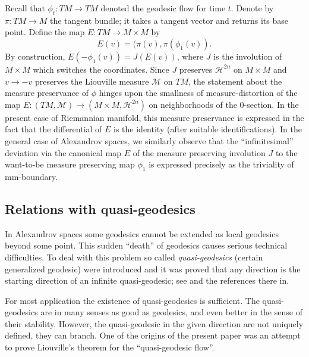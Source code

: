 \documentclass[12pt,leqno]{amsart}
\numberwithin{equation}{section}
\theoremstyle{definition}
\theoremstyle{remark}
\def\:{\colon}
\begin{document}
Recall that $\phi_t\: TM\to TM$ denoted the geodesic flow for time $t$.
Denote by $\pi\: TM\to M$ the tangent bundle; it takes a tangent vector and returns its base point.
Define the map $E\:TM\to M\times M$  by 
\[E(v)=(\pi(v), \pi (\phi _1 (v)).\]  
By construction, $E(-\phi_1(v))= J(E(v))$, 
where $J$ is the involution of $M\times M$ which switches the coordinates. 
Since $J$ preserves $\mathcal H^{2n}$ on $M\times M$ and $v\to -v$ preserves the Liouville measure $\mathcal M$ on $TM$,
the statement about the measure preservance of $\phi$ hinges upon the smallness of measure-distortion of the map $E \:(TM,\mathcal M) \to (M\times M, \mathcal H^{2n})$ on neighborhoods of the $0$-section.
In the present case of Riemannian manifold,
this measure preservance is expressed in  the fact that the differential of $E$ is the identity (after suitable identifications).
In the general case of Alexandrov spaces, we similarly observe that the ``infinitesimal'' deviation via the canonical map $E$ of the measure preserving involution $J$ to the want-to-be measure preserving map $\phi _1$
is expressed precisely as the triviality of  mm-boundary.












\subsection{Relations with quasi-geodesics}
In Alexandrov spaces  some geodesics cannot be extended as local geodesics beyond some point.
This sudden ``death''  of geodesics  causes  serious technical difficulties. 
To deal with this problem  so called \emph{quasi-geodesics} (certain generalized geodesic) 
were introduced
and it was proved
that any direction is the starting direction of an infinite quasi-geodesic;
see \cite{PP} and the references there in.

For most application the existence of quasi-geodesics is sufficient.
The quasi-geodesics are in many senses as good as geodesics, and even better in the sense of their stability.
However, the quasi-geodesic in the given direction are not uniquely defined, they can branch.
One of the origins of the present paper was an attempt to prove Liouville's theorem for the ``quasi-geodesic flow''.
\end{document}
